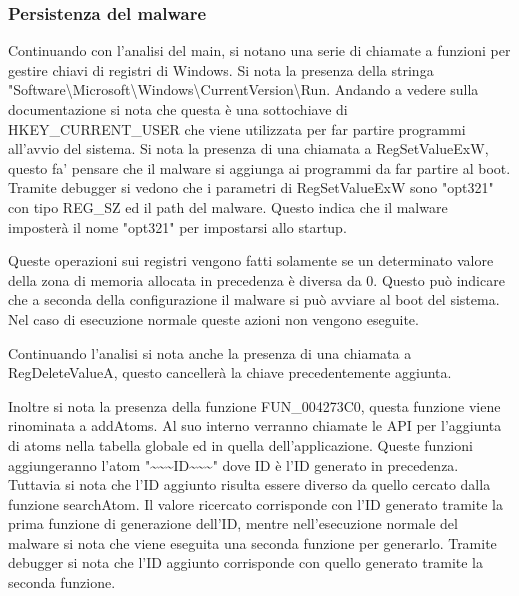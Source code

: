 \documentclass[a4paper,12pt]{article}
\begin{document}
\subsubsection{Persistenza del malware}
Continuando con l'analisi del main, si notano una serie di chiamate a funzioni per gestire chiavi di registri di Windows. Si nota la presenza della stringa "Software\textbackslash Microsoft\textbackslash Windows\textbackslash CurrentVersion\textbackslash Run. Andando a vedere sulla documentazione si nota che questa è una sottochiave di HKEY\_CURRENT\_USER che viene utilizzata per far partire programmi all'avvio del sistema. Si nota la presenza di una chiamata a RegSetValueExW, questo fa' pensare che il malware si aggiunga ai programmi da far partire al boot. Tramite debugger si vedono che i parametri di RegSetValueExW sono "opt321" con tipo REG\_SZ ed il path del malware. Questo indica che il malware imposterà il nome "opt321" per impostarsi allo startup.

Queste operazioni sui registri vengono fatti solamente se un determinato valore della zona di memoria allocata in precedenza è diversa da 0. Questo può indicare che a seconda della configurazione il malware si può avviare al boot del sistema. Nel caso di esecuzione normale queste azioni non vengono eseguite.

Continuando l'analisi si nota anche la presenza di una chiamata a RegDeleteValueA, questo cancellerà la chiave precedentemente aggiunta.

Inoltre si nota la presenza della funzione FUN\_004273C0, questa funzione viene rinominata a addAtoms. Al suo interno verranno chiamate le API per l'aggiunta di atoms nella tabella globale ed in quella dell'applicazione. Queste funzioni aggiungeranno l'atom "\textasciitilde\textasciitilde\textasciitilde ID\textasciitilde\textasciitilde\textasciitilde" dove ID è l'ID generato in precedenza. Tuttavia si nota che l'ID aggiunto risulta essere diverso da quello cercato dalla funzione searchAtom. Il valore ricercato corrisponde con l'ID generato tramite la prima funzione di generazione dell'ID, mentre nell'esecuzione normale del malware si nota che viene eseguita una seconda funzione per generarlo. Tramite debugger si nota che l'ID aggiunto corrisponde con quello generato tramite la seconda funzione.
\end{document}
